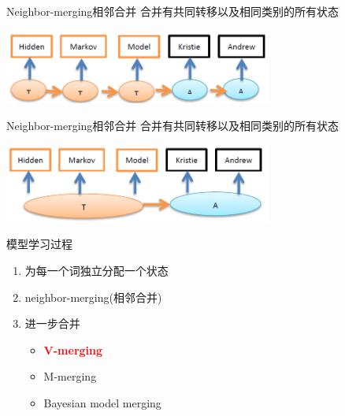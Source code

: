 \documentclass{beamer}
\begin{document}
\begin{frame}{Neighbor-merging相邻合并}
    合并有共同转移以及相同类别的所有状态
    \begin{center}
        \includegraphics[width=250pt]{report5/neighbor-1.png}
    \end{center}
\end{frame}

\begin{frame}{Neighbor-merging相邻合并}
    合并有共同转移以及相同类别的所有状态
    \begin{center}
        \includegraphics[width=250pt]{report5/neighbor-2.png}
    \end{center}
\end{frame}


\begin{frame}{模型学习过程}
    \begin{enumerate}
        \item 为每一个词独立分配一个状态
        \item neighbor-merging(相邻合并)
        \item 进一步合并
            \begin{itemize}
                \item \textbf{\textcolor{red}{V-merging}}
                \item M-merging
                \item Bayesian model merging
            \end{itemize}
    \end{enumerate}
\end{frame}
\end{document}
